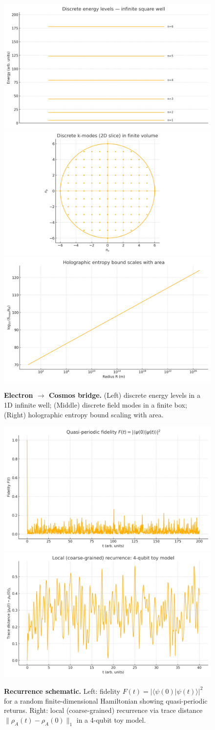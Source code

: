 \documentclass[12pt]{article}
\theoremstyle{remark}
\begin{document}
\begin{figure}[h]
  \centering
\includegraphics[width=0.32\linewidth]{fig_energy_levels}
\includegraphics[width=0.32\linewidth]{fig_k_modes}
\includegraphics[width=0.32\linewidth]{fig_holographic_bound}
  \caption{\textbf{Electron $\to$ Cosmos bridge.} (Left) discrete energy levels in a 1D infinite well; (Middle) discrete field modes in a finite box; (Right) holographic entropy bound scaling with area.}
\end{figure}



\begin{figure}[h]
  \centering
\includegraphics[width=0.48\linewidth]{figs/fig_fidelity.png}
\includegraphics[width=0.48\linewidth]{figs/fig_trace_distance.png}
  \caption{\textbf{Recurrence schematic.} Left: fidelity $F(t)=|\langle\psi(0)|\psi(t)\rangle|^2$ for a random finite-dimensional Hamiltonian showing quasi-periodic returns. Right: local (coarse-grained) recurrence via trace distance $\|\rho_A(t)-\rho_A(0)\|_1$ in a 4-qubit toy model.}
\end{figure}
\end{document}
